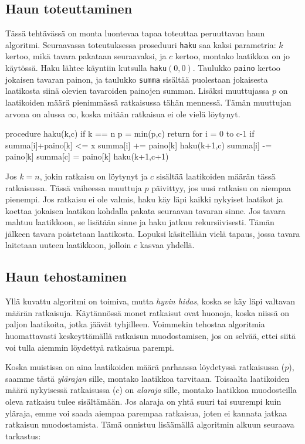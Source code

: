 \subsection{Haun toteuttaminen}

Tässä tehtävässä on monta luontevaa tapaa toteuttaa
peruuttavan haun algoritmi.
Seuraavassa toteutuksessa proseduuri \texttt{haku} saa kaksi parametria:
$k$ kertoo, mikä tavara pakataan seuraavaksi,
ja $c$ kertoo, montako laatikkoa on jo käytössä.
Haku lähtee käyntiin kutsulla \texttt{haku}$(0,0)$.
Taulukko \texttt{paino} kertoo jokaisen tavaran painon,
ja taulukko \texttt{summa} sisältää puolestaan
jokaisesta laatikosta siinä olevien tavaroiden painojen summan.
Lisäksi muuttujassa $p$ on laatikoiden määrä pienimmässä ratkaisussa
tähän mennessä.
Tämän muuttujan arvona on alussa $\infty$,
koska mitään ratkaisua ei ole vielä löytynyt.

\begin{code}
procedure haku(k,c)
    if k == n
        p = min(p,c)
        return
    for i = 0 to c-1
        if summa[i]+paino[k] <= x
            summa[i] += paino[k]
            haku(k+1,c)
            summa[i] -= paino[k]
    summa[c] = paino[k]
    haku(k+1,c+1)
\end{code}

Jos $k=n$, jokin ratkaisu on löytynyt ja $c$ sisältää
laatikoiden määrän tässä ratkaisussa.
Tässä vaiheessa muuttuja $p$ päivittyy,
jos uusi ratkaisu on aiempaa pienempi.
Jos ratkaisu ei ole valmis, haku käy läpi kaikki
nykyiset laatikot ja koettaa jokaisen laatikon
kohdalla pakata seuraavan tavaran sinne.
Jos tavara mahtuu laatikkoon,
se lisätään sinne ja haku jatkuu rekursiivisesti.
Tämän jälkeen tavara poistetaan laatikosta.
Lopuksi käsitellään vielä tapaus, jossa tavara laitetaan
uuteen laatikkoon, jolloin $c$ kasvaa yhdellä.

\subsection{Haun tehostaminen}

Yllä kuvattu algoritmi on toimiva, mutta \emph{hyvin hidas},
koska se käy läpi valtavan määrän ratkaisuja.
Käytännössä monet ratkaisut ovat huonoja, koska niissä on
paljon laatikoita, jotka jäävät tyhjilleen.
Voimmekin tehostaa algoritmia huomattavasti keskeyttämällä
ratkaisun muodostamisen, jos on selvää, ettei siitä voi
tulla aiemmin löydettyä ratkaisua parempi.

Koska muistissa on aina laatikoiden määrä parhaassa
löydetyssä ratkaisussa ($p$),
saamme tästä \emph{ylärajan} sille, montako laatikkoa tarvitaan.
Toisaalta laatikoiden määrä nykyisessä ratkaisussa ($c$) on
\emph{alaraja} sille, montako laatikkoa muodosteilla oleva
ratkaisu tulee sisältämään.
Jos alaraja on yhtä suuri tai suurempi kuin yläraja,
emme voi saada aiempaa parempaa ratkaisua,
joten ei kannata jatkaa ratkaisun muodostamista.
Tämä onnistuu lisäämällä algoritmin alkuun seuraava tarkastus:


